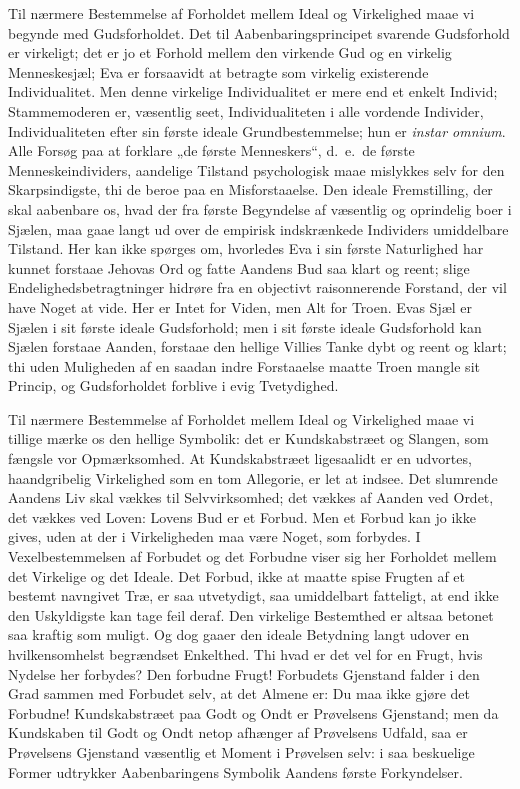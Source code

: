 \documentclass[12pt]{book}
\begin{document}
Til nærmere Bestemmelse af Forholdet mellem Ideal og Virkelighed
maae vi begynde med Gudsforholdet. Det til Aabenbaringsprincipet
svarende Gudsforhold er virkeligt; det er jo et Forhold mellem den
virkende Gud og en virkelig Menneskesjæl; Eva er forsaavidt at
betragte som virkelig existerende Individualitet. Men denne
virkelige Individualitet er mere end et enkelt Individ;
Stammemoderen er, væsentlig seet, Individualiteten i alle vordende
Individer, Individualiteten efter sin første ideale
Grundbestemmelse; hun er \textit{instar omnium}. Alle Forsøg paa at
forklare „de første Menneskers“, d.\ e.\ de første
Menneskeindividers, aandelige Tilstand psychologisk maae
mislykkes selv for den Skarpsindigste, thi de beroe paa en
Misforstaaelse. Den ideale Fremstilling, der skal aabenbare os, hvad
der fra første Begyndelse af væsentlig og oprindelig boer i Sjælen,
maa gaae langt ud over de empirisk indskrænkede Individers
umiddelbare Tilstand. Her kan ikke spørges om, hvorledes Eva i sin
første Naturlighed har kunnet forstaae Jehovas Ord og fatte Aandens
Bud saa klart og reent; slige Endelighedsbetragtninger hidrøre fra
en objectivt raisonnerende Forstand, der vil have Noget at vide. Her
er Intet for Viden, men Alt for Troen. Evas Sjæl er Sjælen i sit
første ideale Gudsforhold; men i sit første ideale Gudsforhold kan
Sjælen forstaae Aanden, forstaae den hellige Villies Tanke dybt og
reent og klart; thi uden Muligheden af en saadan indre Forstaaelse
maatte Troen mangle sit Princip, og Gudsforholdet forblive i evig
Tvetydighed.

Til nærmere Bestemmelse af Forholdet mellem Ideal og Virkelighed
maae vi tillige mærke os den hellige Symbolik: det er
Kundskabstræet og Slangen, som fængsle vor Opmærksomhed. At
Kundskabstræet ligesaalidt er en udvortes, haandgribelig Virkelighed
som en tom Allegorie, er let at indsee. Det slumrende Aandens Liv
skal vækkes til Selvvirksomhed; det vækkes af Aanden ved Ordet, det
vækkes ved Loven: Lovens Bud er et Forbud. Men et Forbud kan jo
ikke gives, uden at der i Virkeligheden maa være Noget, som forbydes.
I Vexelbestemmelsen af Forbudet og det Forbudne viser sig her
Forholdet mellem det Virkelige og det Ideale. Det Forbud, ikke at
maatte spise Frugten af et bestemt navngivet Træ, er saa utvetydigt,
saa umiddelbart fatteligt, at end ikke den Uskyldigste kan tage feil
deraf. Den virkelige Bestemthed er altsaa betonet saa kraftig som
muligt. Og dog gaaer den ideale Betydning langt udover en
hvilkensomhelst begrændset Enkelthed. Thi hvad er det
vel for en Frugt, hvis Nydelse her forbydes? Den forbudne Frugt!
Forbudets Gjenstand falder i den Grad sammen med Forbudet selv, at
det Almene er: Du maa ikke gjøre det Forbudne! Kundskabstræet paa
Godt og Ondt er Prøvelsens Gjenstand; men da Kundskaben til Godt og
Ondt netop afhænger af Prøvelsens Udfald, saa er Prøvelsens
Gjenstand væsentlig et Moment i Prøvelsen selv: i saa beskuelige
Former udtrykker Aabenbaringens Symbolik Aandens første
Forkyndelser.
\end{document}
